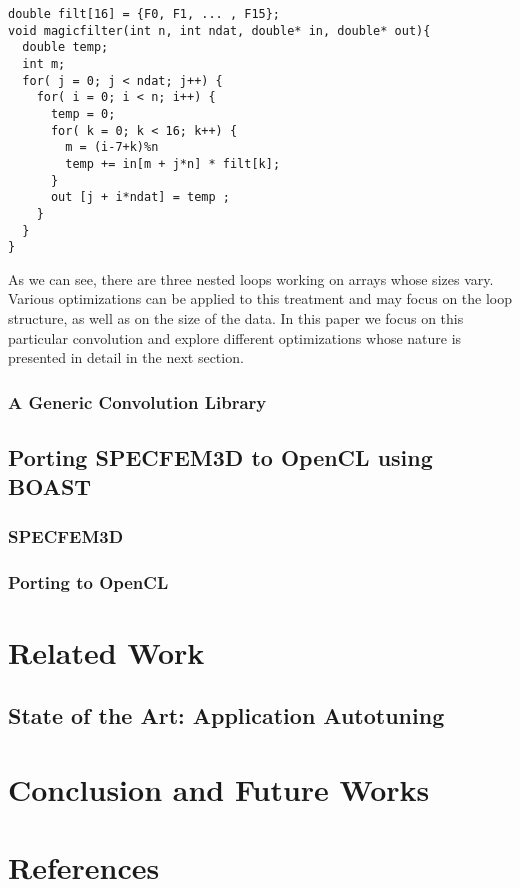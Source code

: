 \documentclass[review]{elsarticle}
\begin{document}
		
\begin{lstlisting}
double filt[16] = {F0, F1, ... , F15};
void magicfilter(int n, int ndat, double* in, double* out){
  double temp;
  int m;
  for( j = 0; j < ndat; j++) {
    for( i = 0; i < n; i++) {
      temp = 0;
      for( k = 0; k < 16; k++) {
        m = (i-7+k)%n
        temp += in[m + j*n] * filt[k];
      }
      out [j + i*ndat] = temp ;
    } 
  }
} 
\end{lstlisting}

As we can see, there are three nested loops working on arrays whose sizes
vary.  Various optimizations can be applied to this treatment and
may focus on the loop structure, as well as on the size of the data.  In this
paper we focus on this particular convolution and explore different
optimizations whose nature is presented in detail in the next section.

    \subsubsection{A Generic Convolution Library}


  \subsection{Porting SPECFEM3D to OpenCL using BOAST}

    \subsubsection{SPECFEM3D}

    \subsubsection{Porting to OpenCL}

\section{Related Work}

  \subsection{State of the Art: Application Autotuning}


\section{Conclusion and Future Works}


\section*{References}


\end{document}
